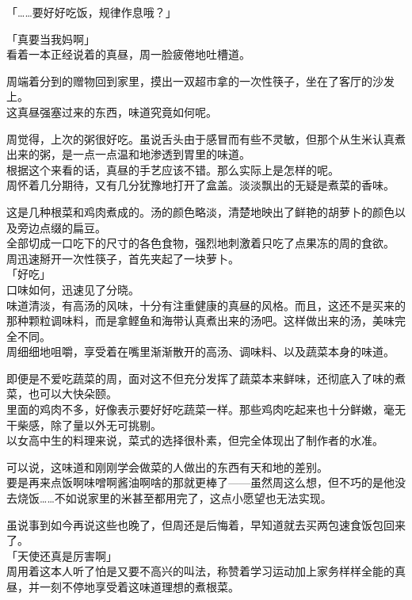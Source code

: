 「……要好好吃饭，规律作息哦？」

「真要当我妈啊」\\

看着一本正经说着的真昼，周一脸疲倦地吐槽道。\\

\vspace{2\baselineskip}

周端着分到的赠物回到家里，摸出一双超市拿的一次性筷子，坐在了客厅的沙发上。\\

这真昼强塞过来的东西，味道究竟如何呢。

周觉得，上次的粥很好吃。虽说舌头由于感冒而有些不灵敏，但那个从生米认真煮出来的粥，是一点一点温和地渗透到胃里的味道。\\

根据这个来看的话，真昼的手艺应该不错。那么实际上是怎样的呢。
\\

周怀着几分期待，又有几分犹豫地打开了盒盖。淡淡飘出的无疑是煮菜的香味。

这是几种根菜和鸡肉煮成的。汤的颜色略淡，清楚地映出了鲜艳的胡萝卜的颜色以及旁边点缀的扁豆。\\

全部切成一口吃下的尺寸的各色食物，强烈地刺激着只吃了点果冻的周的食欲。\\

周迅速掰开一次性筷子，首先夹起了一块萝卜。\\

「好吃」\\

口味如何，迅速见了分晓。\\

味道清淡，有高汤的风味，十分有注重健康的真昼的风格。而且，这还不是买来的那种颗粒调味料，而是拿鲣鱼和海带认真煮出来的汤吧。这样做出来的汤，美味完全不同。\\

周细细地咀嚼，享受着在嘴里渐渐散开的高汤、调味料、以及蔬菜本身的味道。

即便是不爱吃蔬菜的周，面对这不但充分发挥了蔬菜本来鲜味，还彻底入了味的煮菜，也可以大快朵颐。\\

里面的鸡肉不多，好像表示要好好吃蔬菜一样。那些鸡肉吃起来也十分鲜嫩，毫无干柴感，除了量以外无可挑剔。\\

以女高中生的料理来说，菜式的选择很朴素，但完全体现出了制作者的水准。

可以说，这味道和刚刚学会做菜的人做出的东西有天和地的差别。\\

要是再来点饭啊味噌啊酱油啊啥的那就更棒了——虽然周这么想，但不巧的是他没去烧饭……不如说家里的米甚至都用完了，这点小愿望也无法实现。

虽说事到如今再说这些也晚了，但周还是后悔着，早知道就去买两包速食饭包回来了。\\

「天使还真是厉害啊」\\

周用着这本人听了怕是又要不高兴的叫法，称赞着学习运动加上家务样样全能的真昼，并一刻不停地享受着这味道理想的煮根菜。
